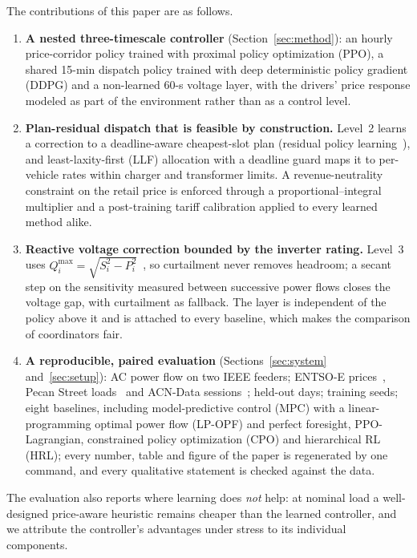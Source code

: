 \documentclass[journal]{IEEEtran}
\newcommand{\Qmax}{Q^{\max}}
\begin{document}
The contributions of this paper are as follows.
\begin{enumerate}
\item \textbf{A nested three-timescale controller} (Section~\ref{sec:method}):
an hourly price-corridor policy trained with proximal policy optimization
(PPO), a shared 15-min dispatch policy trained with deep deterministic policy
gradient (DDPG) and a non-learned 60-s voltage layer, with the drivers' price
response modeled as part of the environment rather than as a control level.
\item \textbf{Plan-residual dispatch that is feasible by construction.}
Level~2 learns a correction to a deadline-aware cheapest-slot plan (residual
policy learning~\cite{silver2018residual,johannink2019residual}), and
least-laxity-first (LLF) allocation with a deadline guard maps it to
per-vehicle rates within charger and transformer limits. A revenue-neutrality
constraint on the retail price is enforced through a proportional--integral
multiplier and a post-training tariff calibration applied to every learned
method alike.
\item \textbf{Reactive voltage correction bounded by the inverter rating.}
Level~3 uses $\Qmax_i=\sqrt{S_i^2-P_i^2}$~\cite{leemput2015}, so curtailment
never removes headroom; a secant step on the sensitivity measured between
successive power flows closes the voltage gap, with curtailment as fallback.
The layer is independent of the policy above it and is attached to every
baseline, which makes the comparison of coordinators fair.
\item \textbf{A reproducible, paired evaluation} (Sections~\ref{sec:system}
and~\ref{sec:setup}): AC power flow on two IEEE feeders; ENTSO-E
prices~\cite{hirth2018}, Pecan Street loads~\cite{pecanstreet} and ACN-Data
sessions~\cite{lee2019acn}; \GEvalDays{} held-out days; \GTrainSeedsWord{}
training seeds; eight baselines, including model-predictive control (MPC) with
a linear-programming optimal power flow (LP-OPF) and perfect foresight,
PPO-Lagrangian, constrained policy optimization (CPO) and hierarchical RL
(HRL); every number, table and figure of the paper is regenerated by one
command, and every qualitative statement is checked against the data.
\end{enumerate}
The evaluation also reports where learning does \emph{not} help: at nominal
load a well-designed price-aware heuristic remains cheaper than the learned
controller, and we attribute the controller's advantages under stress to its
individual components.
\end{document}
